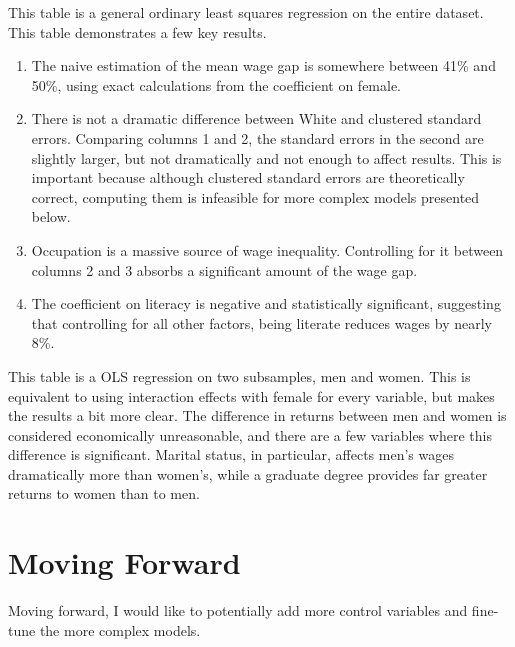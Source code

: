 \documentclass[12pt]{article}
\begin{document}
\newpage



This table is a general ordinary least squares regression on the entire dataset. This table demonstrates a few key results. 

\begin{enumerate}
	\item The naive estimation of the mean wage gap is somewhere between 41\% and 50\%, using exact calculations from the coefficient on female. 
	\item There is not a dramatic difference between White and clustered standard errors. Comparing columns 1 and 2, the standard errors in the second are slightly larger, but not dramatically and not enough to affect results. This is important because although clustered standard errors are theoretically correct, computing them is infeasible for more complex models presented below.
	\item Occupation is a massive source of wage inequality. Controlling for it between columns 2 and 3 absorbs a significant amount of the wage gap.
	\item The coefficient on literacy is negative and statistically significant, suggesting that controlling for all other factors, being literate reduces wages by nearly 8\%. 
\end{enumerate}

\newpage



This table is a OLS regression on two subsamples, men and women. This is equivalent to using interaction effects with female for every variable, but makes the results a bit more clear. The difference in returns between men and women is considered economically unreasonable, and there are a few variables where this difference is significant. Marital status, in particular, affects men's wages dramatically more than women's, while a graduate degree provides far greater returns to women than to men.

\newpage

\section{Moving Forward}

Moving forward, I would like to potentially add more control variables and fine-tune the more complex models.
\end{document}
